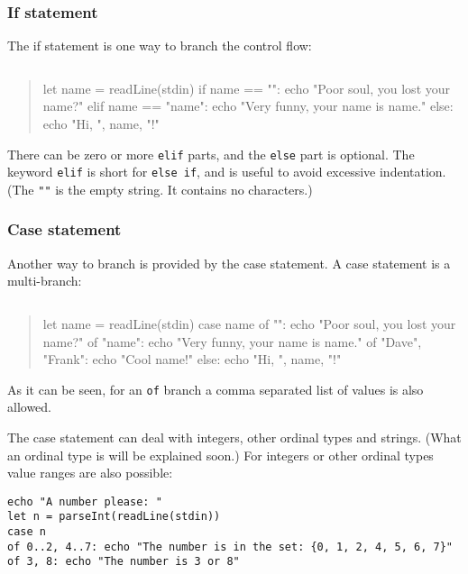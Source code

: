 \hypertarget{if-statement}{%
\subsubsection{If statement}\label{if-statement}}

The if statement is one way to branch the control flow:

\begin{verbatim}
\end{verbatim}

\begin{quote}
let name = readLine(stdin) if name == "": echo "Poor soul, you lost your
name?" elif name == "name": echo "Very funny, your name is name." else:
echo "Hi, ", name, "!"
\end{quote}

There can be zero or more \texttt{elif} parts, and the \texttt{else}
part is optional. The keyword \texttt{elif} is short for
\texttt{else\ if}, and is useful to avoid excessive indentation. (The
\texttt{""} is the empty string. It contains no characters.)

\hypertarget{case-statement}{%
\subsubsection{Case statement}\label{case-statement}}

Another way to branch is provided by the case statement. A case
statement is a multi-branch:

\begin{verbatim}
\end{verbatim}

\begin{quote}
let name = readLine(stdin) case name of "": echo "Poor soul, you lost
your name?" of "name": echo "Very funny, your name is name." of "Dave",
"Frank": echo "Cool name!" else: echo "Hi, ", name, "!"
\end{quote}

As it can be seen, for an \texttt{of} branch a comma separated list of
values is also allowed.

The case statement can deal with integers, other ordinal types and
strings. (What an ordinal type is will be explained soon.) For integers
or other ordinal types value ranges are also possible:

\begin{verbatim}
echo "A number please: "
let n = parseInt(readLine(stdin))
case n
of 0..2, 4..7: echo "The number is in the set: {0, 1, 2, 4, 5, 6, 7}"
of 3, 8: echo "The number is 3 or 8"
\end{verbatim}

